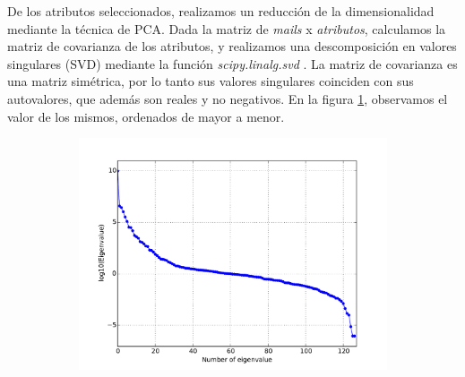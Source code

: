 \documentclass[a4paper,10pt]{article}
\begin{document}
\par De los atributos seleccionados, realizamos un reducción de la dimensionalidad
mediante la técnica de PCA. Dada la matriz de \emph{mails} x \emph{atributos},
calculamos la matriz de covarianza de los atributos, y realizamos una descomposición en valores singulares (SVD) mediante la funci\'on \emph{scipy.linalg.svd} \cite{scipy}. La matriz de covarianza es una matriz simétrica, por lo tanto sus valores singulares coinciden con sus autovalores, que además son reales y no negativos. En la figura \ref{fig:autovalores}, observamos el valor de los mismos, ordenados de mayor a menor. 
  \begin{figure}[H]
    \centering
    \begin{subfigure}[b]{0.4\textwidth}
      \includegraphics[width=\textwidth]{../imagenes/Autovalores}
      \caption{}
    \end{subfigure}
    \label{fig:autovalores}
  \end{figure}
\end{document}
